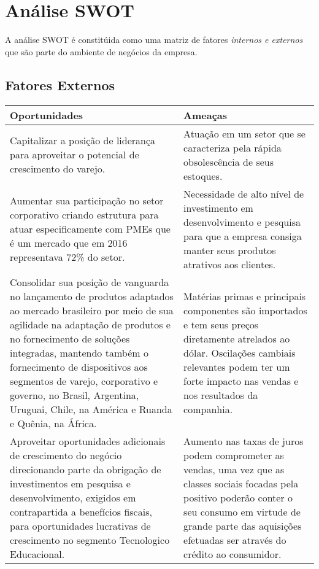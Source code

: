 {{{{\section{Análise SWOT}

A análise SWOT é constitúida como uma matriz de fatores \emph{internos e externos} que são parte do ambiente de negócios da empresa.

\subsection{Fatores Externos}

\begin{center}
\begin{table}[H]
\begin{centering}
\begin{tabular}{>{\centering}p{}|>{\centering}p{}}
\hline 
Oportunidades & Ameaças\tabularnewline
\hline 
Capitalizar a posição de liderança para aproveitar o potencial de
crescimento do varejo. & Atuação em um setor que se caracteriza pela rápida obsolescência de
seus estoques.\tabularnewline
\hline 
Aumentar sua participação no setor corporativo criando estrutura para
atuar especificamente com PMEs que é um mercado que em 2016 representava
72\% do setor.  & Necessidade de alto nível de investimento em desenvolvimento e pesquisa
para que a empresa consiga manter seus produtos atrativos aos clientes.\tabularnewline
\hline 
Consolidar sua posição de vanguarda no lançamento de produtos adaptados
ao mercado brasileiro por meio de sua agilidade na adaptação de produtos
e no fornecimento de soluções integradas, mantendo também o fornecimento
de dispositivos aos segmentos de varejo, corporativo e governo, no
Brasil, Argentina, Uruguai, Chile, na América e Ruanda e Quênia, na
África. & Matérias primas e principais componentes são importados e tem seus
preços diretamente atrelados ao dólar. Oscilações cambiais relevantes
podem ter um forte impacto nas vendas e nos resultados da companhia.\tabularnewline
\hline 
Aproveitar oportunidades adicionais de crescimento do negócio direcionando
parte da obrigação de investimentos em pesquisa e desenvolvimento,
exigidos em contrapartida a benefícios fiscais, para oportunidades
lucrativas de crescimento no segmento Tecnologico Educacional.  & Aumento nas taxas de juros podem comprometer as vendas, uma vez que
as classes sociais focadas pela positivo poderão conter o seu consumo
em virtude de grande parte das aquisições efetuadas ser através do
crédito ao consumidor. \tabularnewline

\end{tabular}
\end{centering}
\end{table}
\end{center}}}}}
